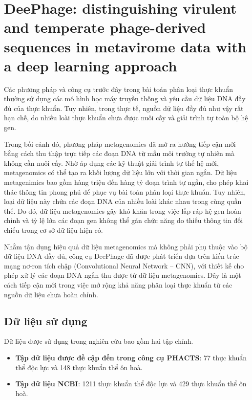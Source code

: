 \section{DeePhage: distinguishing virulent and temperate phage-derived sequences in metavirome data with a deep learning approach \cite{DeePhage_10.1093/gigascience/giab056}}

Các phương pháp và công cụ trước đây trong bài toán phân loại thực khuẩn thường sử dụng các mô hình học máy truyền thống và yêu cầu dữ liệu DNA đầy đủ của thực khuẩn. Tuy nhiên, trong thực tế, nguồn dữ liệu đầy đủ như vậy rất hạn chế, do nhiều loài thực khuẩn chưa được nuôi cấy và giải trình tự toàn bộ hệ gen.

Trong bối cảnh đó, phương pháp metagenomics đã mở ra hướng tiếp cận mới bằng cách thu thập trực tiếp các đoạn DNA từ mẫu môi trường tự nhiên mà không cần nuôi cấy. Nhờ áp dụng các kỹ thuật giải trình tự thế hệ mới, metagenomics có thể tạo ra khối lượng dữ liệu lớn với thời gian ngắn. Dữ liệu metagenimics bao gồm hàng triệu đến hàng tỷ đoạn trình tự ngắn, cho phép khai thác thông tin phong phú để phục vụ bài toán phân loại thực khuẩn. Tuy nhiên, loại dữ liệu này chứa các đoạn DNA của nhiều loài khác nhau trong cùng quần thể. Do đó, dữ liệu metagenomics gây khó khăn trong việc lắp ráp hệ gen hoàn chỉnh và tỷ lệ lớn các đoạn gen không thể gán chức năng do thiếu thông tin đối chiếu trong cơ sở dữ liệu hiện có.

Nhằm tận dụng hiệu quả dữ liệu metagenomics mà không phải phụ thuộc vào bộ dữ liệu DNA đầy đủ, công cụ DeePhage đã được phát triển dựa trên kiến trúc mạng nơ-ron tích chập (Convolutional Neural Network – CNN), với thiết kế cho phép xử lý các đoạn DNA ngắn thu được từ dữ liệu metagenomics. Đây là một cách tiếp cận mới trong việc mở rộng khả năng phân loại thực khuẩn từ các nguồn dữ liệu chưa hoàn chỉnh.

\subsection*{Dữ liệu sử dụng}

Dữ liệu được sử dụng trong nghiên cứu bao gồm hai tập chính.
\begin{itemize}
    \item \textbf{Tập dữ liệu được đề cập đến trong công cụ PHACTS}: 77 thực khuẩn thể độc lực và 148 thực khuẩn thể ôn hoà.
    \item \textbf{Tập dữ liệu NCBI}: 1211 thực khuẩn thể độc lực và 429 thực khuẩn thể ôn hoà.
\end{itemize}
    
